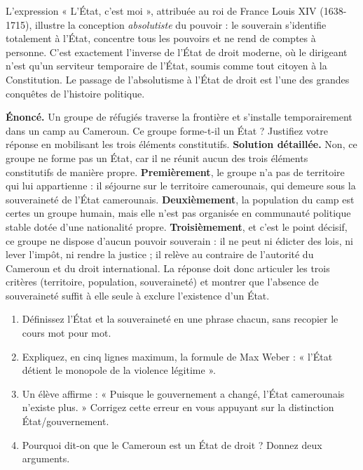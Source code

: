 \documentclass[11pt]{article}
\newcounter{popsec}
\newcounter{popsub}
\newcommand{\courssub}[1]{%
  \stepcounter{popsub}%
  \par\vspace{9pt}\noindent{\popxbold\fontsize{11.5}{13}\selectfont\color{popink}{\color{poporange}\thepopsec.\thepopsub}\hspace{6pt}#1}\par\nopagebreak\vspace{4pt}
}
\begin{document}
\begin{savaistu}
L'expression « L'État, c'est moi », attribuée au roi de France Louis XIV (1638-1715), illustre la conception \emph{absolutiste} du pouvoir : le souverain s'identifie totalement à l'État, concentre tous les pouvoirs et ne rend de comptes à personne. C'est exactement l'inverse de l'État de droit moderne, où le dirigeant n'est qu'un serviteur temporaire de l'État, soumis comme tout citoyen à la Constitution. Le passage de l'absolutisme à l'État de droit est l'une des grandes conquêtes de l'histoire politique.
\end{savaistu}

\courssub{Exercice résolu et entraînement}

\begin{exoresolu}
\textbf{Énoncé.} Un groupe de réfugiés traverse la frontière et s'installe temporairement dans un camp au Cameroun. Ce groupe forme-t-il un État ? Justifiez votre réponse en mobilisant les trois éléments constitutifs.
\tcblower
\textbf{Solution détaillée.} Non, ce groupe ne forme pas un État, car il ne réunit aucun des trois éléments constitutifs de manière propre. \textbf{Premièrement}, le groupe n'a pas de territoire qui lui appartienne : il séjourne sur le territoire camerounais, qui demeure sous la souveraineté de l'État camerounais. \textbf{Deuxièmement}, la population du camp est certes un groupe humain, mais elle n'est pas organisée en communauté politique stable dotée d'une nationalité propre. \textbf{Troisièmement}, et c'est le point décisif, ce groupe ne dispose d'aucun pouvoir souverain : il ne peut ni édicter des lois, ni lever l'impôt, ni rendre la justice ; il relève au contraire de l'autorité du Cameroun et du droit international. La réponse doit donc articuler les trois critères (territoire, population, souveraineté) et montrer que l'absence de souveraineté suffit à elle seule à exclure l'existence d'un État.
\end{exoresolu}

\begin{exercice}
\begin{enumerate}
\item Définissez l'État et la souveraineté en une phrase chacun, sans recopier le cours mot pour mot.
\item Expliquez, en cinq lignes maximum, la formule de Max Weber : « l'État détient le monopole de la violence légitime ».
\item Un élève affirme : « Puisque le gouvernement a changé, l'État camerounais n'existe plus. » Corrigez cette erreur en vous appuyant sur la distinction État/gouvernement.
\item Pourquoi dit-on que le Cameroun est un État de droit ? Donnez deux arguments.
\end{enumerate}
\end{exercice}
\end{document}
